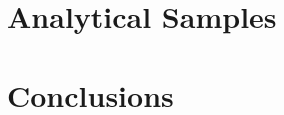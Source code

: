\documentclass[preprint,3p,12pt]{elsarticle}
\begin{document}
\section{Analytical Samples} \label{subsec:4} 

\section{Conclusions}

 
%





\end{document}
